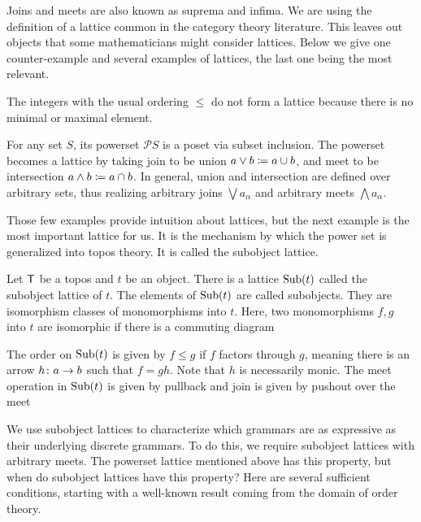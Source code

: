 \documentclass{amsart}
\begin{document}
Joins and meets are also known as suprema and infima. We are
using the definition of a lattice common in the category
theory literature. This leaves out objects that some
mathematicians might consider lattices. Below we give one
counter-example and several examples of lattices, the last
one being the most relevant.

\begin{example}
  The integers with the usual ordering $ \leq $ do not form
  a lattice because there is no minimal or maximal element.
\end{example}

\begin{example}
  For any set $ S $, its powerset $ \mathcal{P}S $ is a
  poset via subset inclusion. The powerset becomes a lattice
  by taking join to be union $ a \vee b \coloneqq a \cup b $,
  and meet to be intersection $ a \wedge b \coloneqq a \cap b
  $. In general, union and intersection are defined over
  arbitrary sets, thus realizing arbitrary joins
  $ \bigvee a_\alpha $ and arbitrary meets
  $ \bigwedge a_\alpha $. 
\end{example}

Those few examples provide intuition about lattices, but the
next example is the most important lattice for us. It is the
mechanism by which the power set is generalized into topos
theory. It is called the subobject lattice.

\begin{example}
  Let $ \mathsf{T} $ be a topos and $ t $ be an object. There is a
  lattice $ \operatorname{Sub} (t) $ called the subobject lattice of
  $ t $.  The elements of $ \operatorname{Sub} (t) $ are called
  subobjects.  They are isomorphism classes of monomorphisms
  into $ t $. Here, two monomorphisms $ f,g $ into $ t $ are
  isomorphic if there is a commuting diagram 
  
  The order on $ \operatorname{Sub} (t) $ is given by $ f \leq g $ if
  $ f $ factors through $ g $, meaning there is an arrow
  $ h \colon a \to b $ such that $ f = gh $. Note that $ h $
  is necessarily monic. The meet operation in $ \operatorname{Sub} (t) $
  is given by pullback  and
  join is given by pushout over the meet
  
\end{example}

We use subobject lattices to characterize which grammars are
as expressive as their underlying discrete grammars. To do
this, we require subobject lattices with arbitrary meets.  The
powerset lattice mentioned above has this property, but
when do subobject lattices have this property?  Here are
several sufficient conditions, starting with a well-known
result coming from the domain of order theory.
\end{document}
